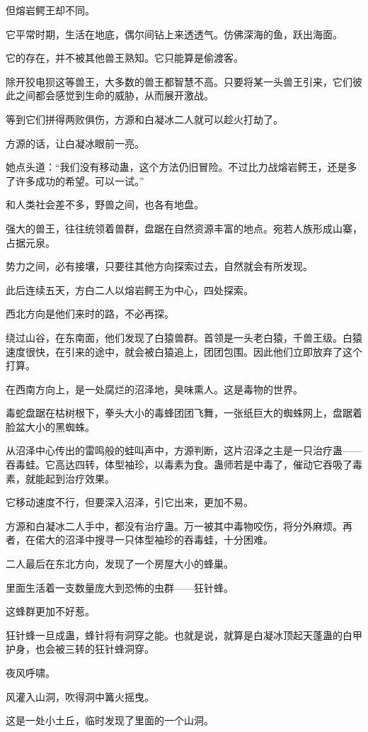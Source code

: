 \begin{this_body}
但熔岩鳄王却不同。

它平常时期，生活在地底，偶尔间钻上来透透气。仿佛深海的鱼，跃出海面。

它的存在，并不被其他兽王熟知。它只能算是偷渡客。

除开狡电狈这等兽王，大多数的兽王都智慧不高。只要将某一头兽王引来，它们彼此之间都会感觉到生命的威胁，从而展开激战。

等到它们拼得两败俱伤，方源和白凝冰二人就可以趁火打劫了。

方源的话，让白凝冰眼前一亮。

她点头道：“我们没有移动蛊，这个方法仍旧冒险。不过比力战熔岩鳄王，还是多了许多成功的希望。可以一试。”

和人类社会差不多，野兽之间，也各有地盘。

强大的兽王，往往统领着兽群，盘踞在自然资源丰富的地点。宛若人族形成山寨，占据元泉。

势力之间，必有接壤，只要往其他方向探索过去，自然就会有所发现。

此后连续五天，方白二人以熔岩鳄王为中心，四处探索。

西北方向是他们来时的路，不必再探。

绕过山谷，在东南面，他们发现了白猿兽群。首领是一头老白猿，千兽王级。白猿速度很快，在引来的途中，就会被白猿追上，团团包围。因此他们立即放弃了这个打算。

在西南方向上，是一处腐烂的沼泽地，臭味熏人。这是毒物的世界。

毒蛇盘踞在枯树根下，拳头大小的毒蜂团团飞舞，一张纸巨大的蜘蛛网上，盘踞着脸盆大小的黑蜘蛛。

从沼泽中心传出的雷鸣般的蛙叫声中，方源判断，这片沼泽之主是一只治疗蛊——吞毒蛙。它高达四转，体型袖珍，以毒素为食。蛊师若是中毒了，催动它吞吸了毒素，就能起到治疗效果。

它移动速度不行，但要深入沼泽，引它出来，更加不易。

方源和白凝冰二人手中，都没有治疗蛊。万一被其中毒物咬伤，将分外麻烦。再者，在偌大的沼泽中搜寻一只体型袖珍的吞毒蛙，十分困难。

二人最后在东北方向，发现了一个房屋大小的蜂巢。

里面生活着一支数量庞大到恐怖的虫群——狂针蜂。

这蜂群更加不好惹。

狂针蜂一旦成蛊，蜂针将有洞穿之能。也就是说，就算是白凝冰顶起天蓬蛊的白甲护身，也会被三转的狂针蜂洞穿。

夜风呼啸。

风灌入山洞，吹得洞中篝火摇曳。

这是一处小土丘，临时发现了里面的一个山洞。


\end{this_body}
